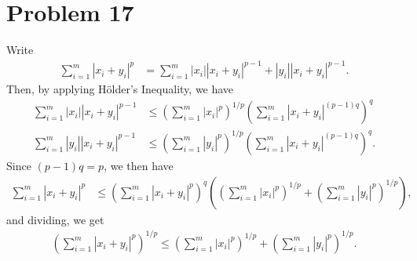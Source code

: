 \documentclass[10pt]{mypackage}
\begin{document}
\section{Problem 17}%
Write
\begin{align*}
  \sum_{i=1}^{m} \left\vert x_i + y_i \right\vert^{p} &= \sum_{i=1}^{m} \left\vert x_i \right\vert\left\vert x_i + y_i \right\vert^{p-1} + \left\vert y_i \right\vert\left\vert x_i + y_i \right\vert^{p-1}.
\end{align*}
Then, by applying Hölder's Inequality, we have
\begin{align*}
  \sum_{i=1}^{m} \left\vert x_i \right\vert\left\vert x_i + y_i \right\vert^{p-1} &\leq \left( \sum_{i=1}^{m} \left\vert x_i \right\vert^{p} \right)^{1/p}\left( \sum_{i=1}^{m} \left\vert x_i + y_i \right\vert^{\left( p-1 \right)q} \right)^{q}\\
  \sum_{i=1}^{m} \left\vert y_i \right\vert\left\vert x_i + y_i \right\vert^{p-1} &\leq \left( \sum_{i=1}^{m} \left\vert y_i \right\vert^{p} \right)^{1/p}\left( \sum_{i=1}^{m} \left\vert x_i + y_i \right\vert^{\left( p-1 \right)q} \right)^{q}.
\end{align*}
Since $\left( p-1 \right)q = p$, we then have
\begin{align*}
  \sum_{i=1}^{m} \left\vert x_i + y_i \right\vert^{p} &\leq \left( \sum_{i=1}^{m}\left\vert x_i + y_i \right\vert^{p} \right)^{q} \left( \left( \sum_{i=1}^{m}\left\vert x_i \right\vert^{p} \right)^{1/p} + \left( \sum_{i=1}^{m} \left\vert y_i \right\vert^{p} \right)^{1/p} \right),
\end{align*}
and dividing, we get
\begin{align*}
  \left( \sum_{i=1}^{m}\left\vert x_i + y_i \right\vert^{p} \right)^{1/p} \leq \left( \sum_{i=1}^{m}\left\vert x_i \right\vert^{p} \right)^{1/p} + \left( \sum_{i=1}^{m}\left\vert y_i \right\vert^{p} \right)^{1/p}.
\end{align*}
\end{document}
